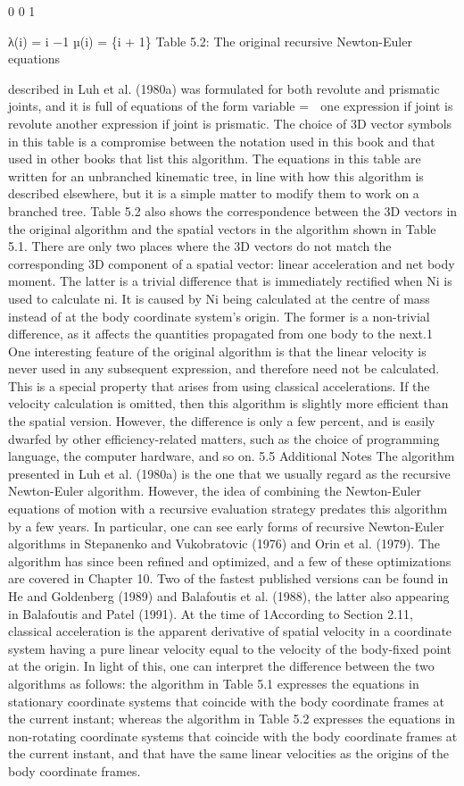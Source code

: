0 0 1

λ(i) = i −1 µ(i) = \{i + 1\} Table 5.2: The original recursive Newton-Euler equations

described in Luh et al. (1980a) was formulated for both revolute and prismatic joints, and it is full of equations of the form variable =  one expression if joint is revolute another expression if joint is prismatic. The choice of 3D vector symbols in this table is a compromise between the notation used in this book and that used in other books that list this algorithm. The equations in this table are written for an unbranched kinematic tree, in line with how this algorithm is described elsewhere, but it is a simple matter to modify them to work on a branched tree. Table 5.2 also shows the correspondence between the 3D vectors in the original algorithm and the spatial vectors in the algorithm shown in Table 5.1. There are only two places where the 3D vectors do not match the corresponding 3D component of a spatial vector: linear acceleration and net body moment. The latter is a trivial difference that is immediately rectified when Ni is used to calculate ni. It is caused by Ni being calculated at the centre of mass instead of at the body coordinate system’s origin. The former is a non-trivial difference, as it affects the quantities propagated from one body to the next.1 One interesting feature of the original algorithm is that the linear velocity is never used in any subsequent expression, and therefore need not be calculated. This is a special property that arises from using classical accelerations. If the velocity calculation is omitted, then this algorithm is slightly more efficient than the spatial version. However, the difference is only a few percent, and is easily dwarfed by other efficiency-related matters, such as the choice of programming language, the computer hardware, and so on. 5.5 Additional Notes The algorithm presented in Luh et al. (1980a) is the one that we usually regard as the recursive Newton-Euler algorithm. However, the idea of combining the Newton-Euler equations of motion with a recursive evaluation strategy predates this algorithm by a few years. In particular, one can see early forms of recursive Newton-Euler algorithms in Stepanenko and Vukobratovic (1976) and Orin et al. (1979). The algorithm has since been refined and optimized, and a few of these optimizations are covered in Chapter 10. Two of the fastest published versions can be found in He and Goldenberg (1989) and Balafoutis et al. (1988), the latter also appearing in Balafoutis and Patel (1991). At the time of 1According to Section 2.11, classical acceleration is the apparent derivative of spatial velocity in a coordinate system having a pure linear velocity equal to the velocity of the body-fixed point at the origin. In light of this, one can interpret the difference between the two algorithms as follows: the algorithm in Table 5.1 expresses the equations in stationary coordinate systems that coincide with the body coordinate frames at the current instant; whereas the algorithm in Table 5.2 expresses the equations in non-rotating coordinate systems that coincide with the body coordinate frames at the current instant, and that have the same linear velocities as the origins of the body coordinate frames.

